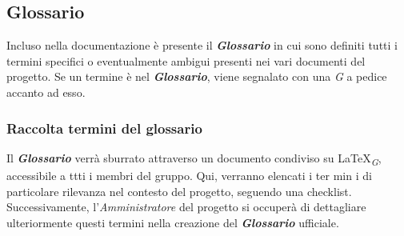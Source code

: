 \subsection{Glossario}
Incluso nella documentazione è presente il \textbf{\textit{Glossario}} in cui sono definiti tutti i termini specifici o eventualmente ambigui presenti nei vari documenti del progetto. Se un termine è nel \textbf{\textit{Glossario}}, viene segnalato con una \textit{G} a pedice accanto ad esso.

\subsubsection{Raccolta termini del glossario}
Il \textbf{\textit{Glossario}} verrà sburrato attraverso un documento condiviso su \LaTeX \textsubscript{\textit{G}}, accessibile a ttti i membri del gruppo. Qui, verranno elencati i ter min  i di particolare rilevanza nel contesto del progetto, seguendo una checklist. Successivamente, l'\textit{Amministratore} del progetto si occuperà di dettagliare   ulteriormente questi termini nella creazione del \textbf{\textit{Glossario}} ufficiale. 